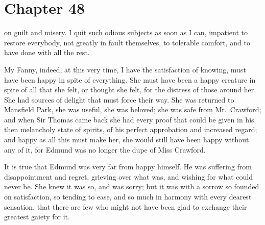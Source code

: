 \chapter{Chapter 48}

 on guilt and misery.  I quit such odious
subjects as soon as I can, impatient to restore everybody,
not greatly in fault themselves, to tolerable comfort,
and to have done with all the rest.

My Fanny, indeed, at this very time, I have the satisfaction
of knowing, must have been happy in spite of everything.
She must have been a happy creature in spite of all that she felt,
or thought she felt, for the distress of those around her.
She had sources of delight that must force their way.
She was returned to Mansfield Park, she was useful,
she was beloved; she was safe from Mr.\ Crawford;
and when Sir Thomas came back she had every proof that
could be given in his then melancholy state of spirits,
of his perfect approbation and increased regard;
and happy as all this must make her, she would still have
been happy without any of it, for Edmund was no longer
the dupe of Miss Crawford.

It is true that Edmund was very far from happy himself.
He was suffering from disappointment and regret,
grieving over what was, and wishing for what could never be.
She knew it was so, and was sorry; but it was with a
sorrow so founded on satisfaction, so tending to ease,
and so much in harmony with every dearest sensation,
that there are few who might not have been glad to exchange
their greatest gaiety for it.

